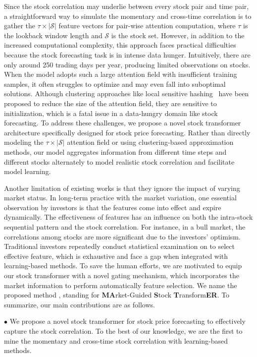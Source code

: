 Since the stock correlation may underlie between every stock pair and time pair, a straightforward way to simulate the momentary and cross-time correlation is to gather the $\tau \times |\mathcal{S}|$ feature vectors for pair-wise attention computation, where $\tau$ is the lookback window length and $\mathcal{S}$ is the stock set.
However, in addition to the increased computational complexity, this approach faces practical difficulties because the stock forecasting task is in intense data hunger. 
Intuitively, there are only around 250 trading days per year, producing limited observations on stocks.
When the model adopts such a large attention field with insufficient training samples, it often struggles to optimize and may even fall into suboptimal solutions. 
Although clustering approaches like local sensitive hashing~\cite{kitaev2020reformer} have been proposed to reduce the size of the attention field, they are sensitive to initialization, which is a fatal issue in a data-hungry domain like stock forecasting.
To address these challenges, we propose a novel stock transformer architecture specifically designed for stock price forecasting. Rather than directly modeling the $\tau \times |\mathcal{S}|$ attention field or using clustering-based approximation methods, our model aggregates information from different time steps and different stocks alternately to model realistic stock correlation and facilitate model learning.

Another limitation of existing works is that they ignore the impact of varying market status.
In long-term practice with the market variation, one essential observation by investors is that the features come into effect and expire dynamically. 
The effectiveness of features has an influence on both the intra-stock sequential pattern and the stock correlation. 
For instance, in a bull market, the correlations among stocks are more significant due to the investors' optimism.
Traditional investors repeatedly conduct statistical examination on to select effective feature, which is exhaustive and face a gap when integrated with learning-based methods. 
To save the human efforts, we are motivated to equip our stock transformer with a novel gating mechanism, which incorporates the market information to perform automatically feature selection.  
We name the proposed method \frameworkname, standing for \textbf{MA}rket-Guided \textbf{S}tock \textbf{T}ransform\textbf{ER}. 
To summarize, our main contributions are as follows.

$\bullet$ We propose a novel stock transformer for stock price forecasting to effectively capture the stock correlation. To the best of our knowledge, we are the first to mine the momentary and cross-time stock correlation with learning-based methods. 

